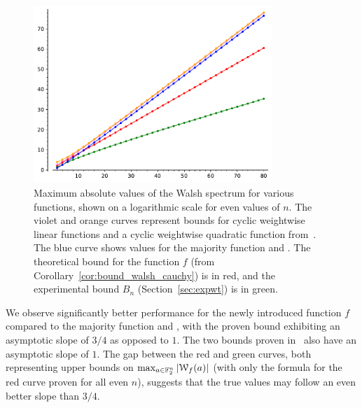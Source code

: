 \documentclass[11pt]{llncs}
\begin{document}
\begin{figure}
	\centering
	\includegraphics[width=9cm]{comparison_walsh_bound.pdf}
	\caption{
		Maximum absolute values of the Walsh spectrum for various functions, shown on a logarithmic scale for even values of $n$. 
		The violet and orange curves represent bounds for cyclic weightwise linear functions and a cyclic weightwise quadratic function from~\cite{DAM:MeaOza24}. The blue curve shows values for the majority function and \hwbf{}. The theoretical bound for the function $f$ (from Corollary~\ref{cor:bound_walsh_cauchy}) is in red, and the experimental bound $B_n$ (Section~\ref{sec:expwt}) is in green.}
	\label{fig:walsh_bound_comparison}
\end{figure}



We observe significantly better performance for the newly introduced function $f$ compared to the majority function and \hwbf{}, with the proven bound exhibiting an asymptotic slope of $ 3/4$ as opposed to $1$. The two bounds proven in~\cite{DAM:MeaOza24} also have an asymptotic slope of $1$.
The gap between the red and green curves, both representing upper bounds on $ \max_{a \in \mathbb{F}_2^n} |\mathcal W_{f}(a)| $ (with only the formula for the red curve proven for all even $n$), suggests that the true values may follow an even better slope than $ 3/4$.
\end{document}
